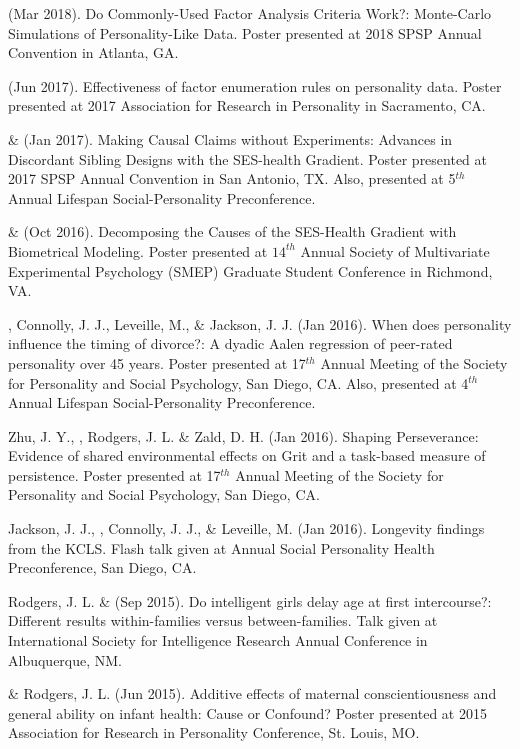 \item\meb (Mar 2018). Do Commonly-Used Factor Analysis Criteria Work?: Monte-Carlo Simulations of Personality-Like Data.  Poster presented at 2018 SPSP Annual Convention in Atlanta, GA. 
\item\meb (Jun 2017). Effectiveness of factor enumeration rules on personality data.  Poster presented at 2017 Association for Research in Personality in Sacramento, CA.
%
\item\meb \& \joe (Jan 2017). Making Causal Claims without Experiments: Advances in Discordant Sibling Designs with the SES-health Gradient. Poster presented at 2017 SPSP Annual Convention in San Antonio, TX. Also, presented at 5$^{th}$ Annual Lifespan Social-Personality  Preconference.
%
\item\meb \& \joe (Oct 2016). Decomposing the Causes of the SES-Health Gradient with Biometrical Modeling. Poster presented at $14^{th}$ Annual Society of Multivariate Experimental Psychology (SMEP) Graduate Student Conference in Richmond, VA.
%
\item \meb, Connolly, J. J., Leveille, M., \& Jackson, J. J. (Jan 2016). When does personality influence the timing of divorce?: A dyadic Aalen regression of peer-rated personality over 45 years. Poster presented at 17$^{th}$ Annual Meeting of the Society for Personality and Social Psychology, San Diego, CA. Also, presented at 4$^{th}$ Annual Lifespan Social-Personality  Preconference.
%
\item Zhu, J. Y., \meb, Rodgers, J. L. \& Zald, D. H. (Jan 2016). Shaping Perseverance: Evidence of shared environmental effects on Grit and a task-based measure of persistence. Poster presented at 17$^{th}$ Annual Meeting of the Society for Personality and Social Psychology, San Diego, CA.
\item Jackson, J. J., \meb, Connolly, J. J., \& Leveille, M. (Jan 2016). Longevity findings from the KCLS. Flash talk given at Annual Social Personality Health Preconference, San Diego, CA. %
%
\item Rodgers, J. L. \& \meb (Sep 2015). Do intelligent girls delay age at first intercourse?:  Different results within-families versus between-families. Talk given at International Society for Intelligence Research Annual Conference in Albuquerque, NM.
%
\item \meb \& Rodgers, J. L. (Jun 2015). Additive effects of maternal conscientiousness and general ability on infant health: Cause or Confound? Poster presented at 2015 Association for Research in Personality Conference, St. Louis, MO.%
